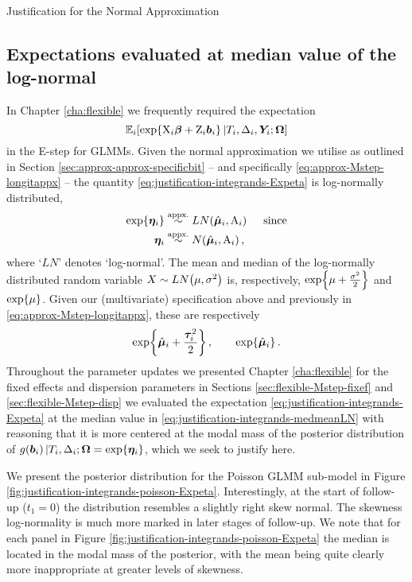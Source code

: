 \begin{chapter}{\label{cha:justification}Justification for the Normal Approximation}
  \subsection{Expectations evaluated at median value of the log-normal}\label{sec:justification-integrands-medians}
  In Chapter \ref{cha:flexible} we frequently required the expectation
  \begin{equation}
      \mathbb{E}_i\!\left[\exp\!\left\{\mathrm{X}_i\bm{\beta}+\mathrm{Z}_i\bm{b}_i\right\}|T_i,\Delta_i,\bm{Y}_i;\bm{\mathrm{\Omega}}\right]
  \label{eq:justification-integrands-Expeta}
  \end{equation}
  in the E-step for GLMMs. Given the normal approximation we utilise as outlined in Section \ref{sec:approx-approx-specificbit} -- and specifically \eqref{eq:approx-Mstep-longitappx} -- the quantity \eqref{eq:justification-integrands-Expeta} is log-normally distributed, \ie
  \begin{align*}
      \exp\lbr\linp\rbr&\appx LN\lb\hbmu,\Amat\rb\quad\ \mathrm{since}\\
      \linp&\appx N\lb\hbmu,\Amat\rb,
  \end{align*}
  where `$LN$' denotes `log-normal'. The mean and median of the log-normally distributed random variable $X\sim LN\!\left(\mu,\sigma^2\right)$ is, respectively, $\exp\!\left\{\mu+\frac{\sigma^2}{2}\right\}$ and $\exp\!\left\{\mu\right\}$. Given our (multivariate) specification above and previously in \eqref{eq:approx-Mstep-longitappx}, these are respectively
  \begin{equation}
      \begin{aligned}
          \exp\!\left\{\hat{\bm{\mu}}_i+\frac{\bm{\tau}_i^2}{2}\right\},\qquad\exp\!\left\{\hat{\bm{\mu}}_i\right\}.
      \end{aligned}
  \label{eq:justification-integrands-medmeanLN}
  \end{equation}
  Throughout the parameter updates we presented Chapter \ref{cha:flexible} for the fixed effects and dispersion parameters in Sections \ref{sec:flexible-Mstep-fixef} and \ref{sec:flexible-Mstep-disp} we evaluated the expectation \eqref{eq:justification-integrands-Expeta} at the median value in \eqref{eq:justification-integrands-medmeanLN} with reasoning that it is more centered at the modal mass of the posterior distribution of $g\!\left(\bm{b}_i\right)|T_i,\Delta_i;\bm{\mathrm{\Omega}}=\exp\!\left\{\bm{\eta}_i\right\}$, which we seek to justify here.

  We present the posterior distribution for the Poisson GLMM sub-model in Figure \ref{fig:justification-integrands-poisson-Expeta}. Interestingly, at the start of follow-up ($t_1=0$) the distribution resembles a slightly right skew normal. The skewness \ie log-normality is much more marked in later stages of follow-up. We note that for each panel in Figure \ref{fig:justification-integrands-poisson-Expeta} the median is located in the modal mass of the posterior, with the mean being quite clearly more inappropriate at greater levels of skewness.


\end{chapter}
